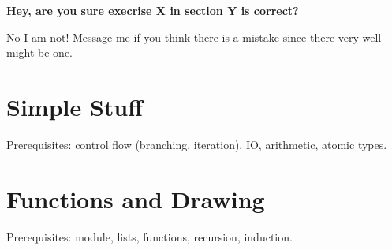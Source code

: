 \begin{flushleft}
\textbf{Hey, are you sure execrise X in section Y is correct?}
\end{flushleft}
\begin{flushright}
No I am not! Message me if you think there is a mistake since there very well might be one.
\end{flushright}

\tableofcontents

\section{Simple Stuff}
Prerequisites: control flow (branching, iteration), IO, arithmetic, atomic types.


\section{Functions and Drawing}
Prerequisites:  module, lists, functions, recursion, induction.


\clearpage
\doclicenseThis


